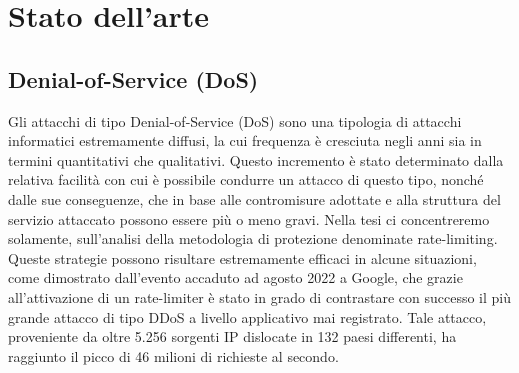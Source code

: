 \chapter{Stato dell'arte}
\label{ch:state of the art}
\section{Denial-of-Service (DoS)}
\label{sec:Denial-of-Service (DoS)}
Gli attacchi di tipo Denial-of-Service (DoS) sono una tipologia di attacchi informatici estremamente diffusi, la cui
frequenza è cresciuta negli anni sia in termini quantitativi che qualitativi. Questo incremento è stato determinato
dalla relativa facilità con cui è possibile condurre un attacco di questo tipo, nonché dalle sue conseguenze, che in
base alle contromisure adottate e alla struttura del servizio attaccato possono essere più o meno gravi.
Nella tesi ci concentreremo solamente, sull'analisi della metodologia di protezione denominate rate-limiting. Queste
strategie possono risultare estremamente efficaci in alcune situazioni, come dimostrato dall'evento accaduto ad agosto
2022 a Google, che grazie all’attivazione di un rate-limiter è stato in grado di contrastare con
successo il più grande attacco di tipo DDoS a livello applicativo mai registrato. Tale attacco, proveniente da oltre
5.256 sorgenti IP dislocate in 132 paesi differenti, ha raggiunto il picco di 46 milioni di richieste al secondo.

